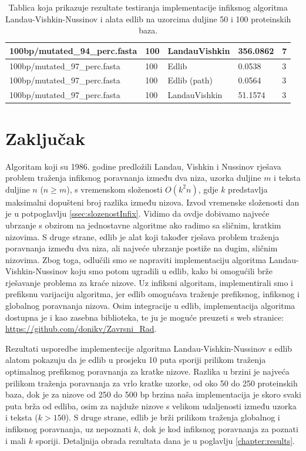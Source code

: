 \documentclass[times, utf8, zavrsni]{fer}
\begin{document}
\begin{table}[]
\begin{tabular}{|l|l|l|l|l|}
100bp/mutated\_94\_perc.fasta & 100 & LandauVishkin & 356.0862 & 7 \\ \hline
100bp/mutated\_97\_perc.fasta & 100 & Edlib & 0.0538 & 3 \\ \hline
100bp/mutated\_97\_perc.fasta & 100 & Edlib (path) & 0.0564 & 3 \\ \hline
100bp/mutated\_97\_perc.fasta & 100 & LandauVishkin & 51.1574 & 3 \\ \hline
\end{tabular}
\caption{Tablica koja prikazuje rezultate testiranja implementacije infiksnog algoritma Landau-Vishkin-Nussinov i alata edlib na uzorcima duljine 50 i 100 proteinskih baza.}
\label{tab:resultsInfix50}
\end{table}

\chapter{Zaključak}
Algoritam koji su 1986. godine predložili Landau, Vishkin i Nussinov \citep{Landau1986} rješava problem traženja infiksnog poravnanja između dva niza, uzorka duljine $m$ i teksta duljine $n$ ($n\geq m$), s vremenskom složenosti $O(k^2n)$, gdje $k$ predstavlja maksimalni dopušteni broj razlika između nizova. Izvod vremenske složenosti dan je u potpoglavlju \ref{ssec:slozenostInfix}. Vidimo da ovdje dobivamo najveće ubrzanje s obzirom na jednostavne algoritme ako radimo sa sličnim, kratkim nizovima. S druge strane, edlib \citep{edlib} je alat koji također rješava problem traženja poravnanja između dva niza, ali najveće ubrzanje postiže na dugim, sličnim nizovima. Zbog toga, odlučili smo se napraviti implementaciju algoritma Landau-Vishkin-Nussinov koju smo potom ugradili u edlib, kako bi omogućili brže rješavanje problema za kraće nizove. Uz infiksni algoritam, implementirali smo i prefiksnu varijaciju algoritma, jer edlib omogućava traženje prefiksnog, infiksnog i globalnog poravnanja nizova. Osim integracije u edlib, implementacija algoritma dostupna je i kao zasebna biblioteka, te ju je moguće preuzeti s web stranice: \href{https://github.com/donikv/Zavrsni_Rad}{https://github.com/donikv/Zavrsni\_Rad}.

Rezultati usporedbe implementecije algoritma Landau-Vishkin-Nussinov s edlib alatom pokazuju da je edlib u prosjeku 10 puta sporiji prilikom traženja optimalnog prefiksnog poravnanja za kratke nizove. Razlika u brzini je najveća prilikom traženja poravnanja za vrlo kratke uzorke, od oko 50 do 250 proteinskih baza, dok je za nizove od 250 do 500 bp brzina naša implementacija je skoro svaki puta brža od edliba, osim za najduže nizove s velikom udaljenosti između uzorka i teksta ($k>150$). S druge strane, edlib je brži prilikom traženja globalnog i infiksnog poravnanja, uz nepoznati $k$, dok je kod infiksnog poravnanja za poznati i mali $k$ sporiji. Detaljnija obrada rezultata dana je u poglavlju \ref{chapter:results}.
\end{document}

